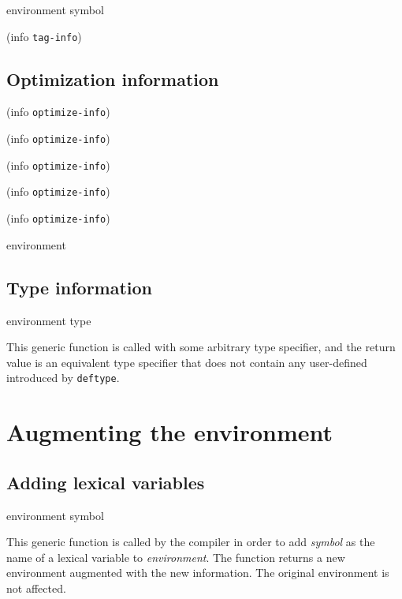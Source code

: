  {environment symbol}



 {(info {\tt tag-info})}

\subsection{Optimization information}







 {(info {\tt optimize-info})}

 {(info {\tt optimize-info})}

 {(info {\tt optimize-info})}

 {(info {\tt optimize-info})}

 {(info {\tt optimize-info})}

 {environment}

\subsection{Type information}

 {environment type}

This generic function is called with some arbitrary type specifier,
and the return value is an equivalent type specifier that does not
contain any user-defined introduced by \texttt{deftype}. 

\section{Augmenting the environment}

\subsection{Adding lexical variables}

 {environment symbol}

This generic function is called by the compiler in order to add
\textit{symbol} as the name of a lexical variable to
\textit{environment}.  The function returns a new environment
augmented with the new information.  The original environment is not
affected.

